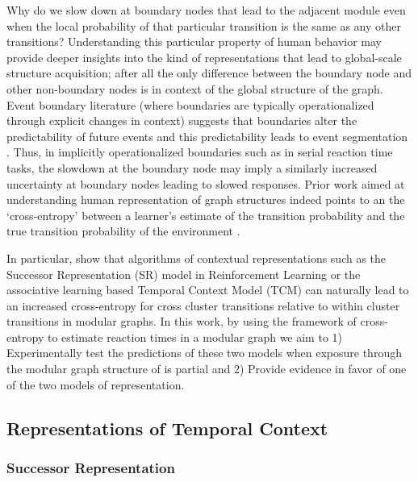 Why do we slow down at boundary nodes that lead to the adjacent module even when the local probability of that particular transition is the same as any other transitions? Understanding this particular property of human behavior may provide deeper insights into the kind of representations that lead to global-scale structure acquisition; after all the only difference between the boundary node and other non-boundary nodes is in context of the global structure of the graph. Event boundary literature (where boundaries are typically operationalized through explicit changes in context) suggests that boundaries alter the predictability of future events and this predictability leads to event segmentation \cite{zacks2007event, clewett2019transcending}. Thus, in implicitly operationalized boundaries such as in serial reaction time tasks, the slowdown at the boundary node may imply a similarly increased uncertainty at boundary nodes leading to slowed responses. Prior work aimed at understanding human representation of graph structures indeed points to an the `cross-entropy' between a learner's estimate of the transition probability and the true transition probability of the environment \cite{lynn2020abstract, lynn2020humans, lynn2020human}. 


In particular, \cite{lynn2020human} show that algorithms of contextual representations such as the Successor Representation (SR) model in Reinforcement Learning \cite{dayan1993improving, momennejad2017successor, gershman2018successor} or the associative learning based Temporal Context Model (TCM) can naturally lead to an increased cross-entropy for cross cluster transitions relative to within cluster transitions in modular graphs. In this work, by using the framework of cross-entropy to estimate reaction times in a modular graph we aim to 1) Experimentally test the predictions of these two models when exposure through the modular graph structure of is partial and 2) Provide evidence in favor of one of the two models of representation. 

\subsection{Representations of Temporal Context}

\subsubsection*{Successor Representation}\label{successor-representation}

